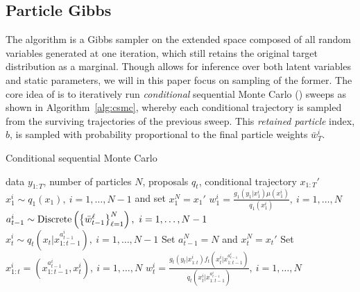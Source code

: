 
% 
% 
\subsection{Particle Gibbs}
\label{sec:inf:smc:pg}
The \pg algorithm \citep{andrieuDH2010} is a Gibbs sampler on the extended space composed of all random variables generated at one iteration, which still retains the original target distribution as a marginal. Though \pg allows for inference over both latent variables and static parameters, we will in this paper focus on sampling of the former.  The core idea of \pg is to iteratively run \emph{conditional} sequential Monte Carlo (\csmc) sweeps as shown in Algorithm~\ref{alg:csmc}, whereby each conditional trajectory is sampled from the surviving trajectories of the previous sweep.  This \emph{retained particle} index, $b$, is sampled with probability proportional to the final particle weights $\bar{w}^i_T$. 


\begin{algorithm}[tb]
	\caption{Conditional sequential Monte Carlo}
	\label{alg:csmc}
	\begin{spacing}{1.2}
		\begin{algorithmic}[1]
			 data $y_{1:T}$, number of particles $N$, proposals $q_t$, conditional trajectory $x_{1:T}'$
			\STATE $x_1^i \sim q_1(x_1), ~i=1,\ldots,N-1$ and set $x_1^N = x_1'$
			\STATE $w_1^i = \frac{g_1(y_1|x_1^i) \mu(x_1^i)}{q_1(x_1^i)}, ~i=1,\ldots,N$
			\STATE $a_{t-1}^i \sim \operatorname*{Discrete}\left(\left\{\bar w_{t-1}^\ell\right\}_{\ell=1}^N\right), ~i=1,\ldots,N-1$
			\STATE $x_t^i \sim q_t(x_t | x_{1:t-1}^{a_{t-1}^i}), ~i=1,\ldots,N-1$
			\STATE Set $a_{t-1}^N = N$ and $x_t^N = x_t'$
			\STATE Set $x_{1:t}^i = (x_{1:t-1}^{a_{t-1}^i},x_t^i), ~i=1,\ldots,N$
			\STATE $w_t^i = \frac{g_t(y_t|x_{1:t}^i) f_t(x_t^i | x_{1:t-1}^{a_{t-1}^i})}{q_t(x_t^i|x_{1:t-1}^{a_{t-1}^i})}, ~i=1,\ldots,N$
			\ENDFOR
		\end{algorithmic}
	\end{spacing}
\end{algorithm}

